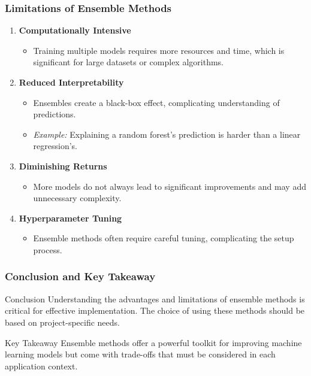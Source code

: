 \documentclass[aspectratio=169]{beamer}
\begin{document}
\begin{frame}[fragile]
    \frametitle{Limitations of Ensemble Methods}
    \begin{enumerate}
        \item \textbf{Computationally Intensive}
            \begin{itemize}
                \item Training multiple models requires more resources and time, which is significant for large datasets or complex algorithms.
            \end{itemize}

        \item \textbf{Reduced Interpretability}
            \begin{itemize}
                \item Ensembles create a black-box effect, complicating understanding of predictions.
                \item \textit{Example:} Explaining a random forest's prediction is harder than a linear regression's.
            \end{itemize}

        \item \textbf{Diminishing Returns}
            \begin{itemize}
                \item More models do not always lead to significant improvements and may add unnecessary complexity.
            \end{itemize}

        \item \textbf{Hyperparameter Tuning}
            \begin{itemize}
                \item Ensemble methods often require careful tuning, complicating the setup process.
            \end{itemize}
    \end{enumerate}
\end{frame}

\begin{frame}[fragile]
    \frametitle{Conclusion and Key Takeaway}
    \begin{block}{Conclusion}
        Understanding the advantages and limitations of ensemble methods is critical for effective implementation. The choice of using these methods should be based on project-specific needs.
    \end{block}
    \begin{block}{Key Takeaway}
        Ensemble methods offer a powerful toolkit for improving machine learning models but come with trade-offs that must be considered in each application context.
    \end{block}
\end{frame}
\end{document}
